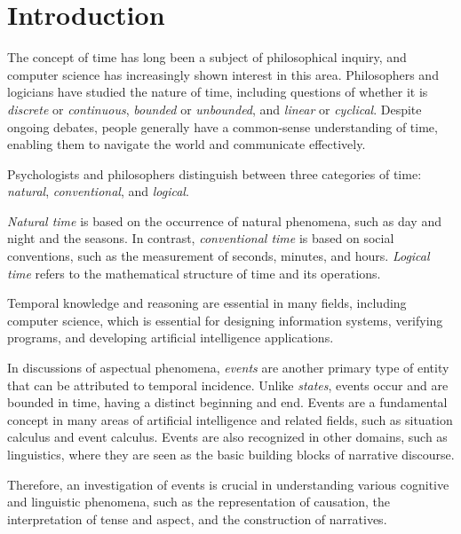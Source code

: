 \chapter{Introduction}
The concept of time has long been a subject of philosophical inquiry, and computer science has increasingly shown interest in this area.
Philosophers and logicians have studied the nature of time, including questions of whether it is \textit{discrete} or \textit{continuous}, \textit{bounded} or \textit{unbounded}, and \textit{linear} or \textit{cyclical}.
Despite ongoing debates, people generally have a common-sense understanding of time, enabling them to navigate the world and communicate effectively.

Psychologists and philosophers distinguish between three categories of time: \textit{natural}, \textit{conventional}, and \textit{logical}.

\textit{Natural time} is based on the occurrence of natural phenomena, such as day and night and the seasons. In contrast, \textit{conventional time} is based on social conventions, such as the measurement of seconds, minutes, and hours.
\textit{Logical time} refers to the mathematical structure of time and its operations.

Temporal knowledge and reasoning are essential in many fields, including computer science, which is essential for designing information systems, verifying programs, and developing artificial intelligence applications. 

In discussions of aspectual phenomena, \textit{events} are another primary type of entity that can be attributed to temporal incidence. 
Unlike \textit{states}, events \cite{vendler1957verbs} occur and are bounded in time, having a distinct beginning and end. Events are a fundamental concept in many areas of artificial intelligence and related fields, such as situation calculus and event calculus.
Events are also recognized in other domains, such as linguistics, where they are seen as the basic building blocks of narrative discourse.

Therefore, an investigation of events is crucial in understanding various cognitive and linguistic phenomena, such as the representation of causation, the interpretation of tense and aspect, and the construction of narratives.


